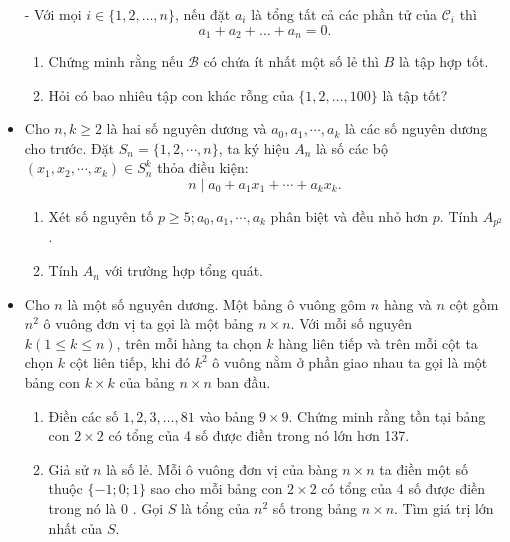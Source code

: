 \documentclass[11pt]{scrartcl}
\begin{document}
\begin{itemize}[label=, leftmargin=0em, itemsep=-0em]
\begin{btvn}
        - Với mọi $i \in\{1,2, \ldots, n\}$, nếu đặt $a_i$ là tổng tất cả các phần tử của $\mathcal{C}_i$ thì
        $$
        a_1+a_2+\ldots+a_n=0 .
        $$
        \begin{enumerate}[label=(\alph*)]
            \item Chứng minh rằng nếu $\mathcal{B}$ có chứa ít nhất một số lẻ thì $B$ là tập hợp tốt.
            \item Hỏi có bao nhiêu tập con khác rỗng của $\{1,2, \ldots, 100\}$ là tập tốt?
        \end{enumerate}
    \end{btvn}
    \item \begin{btvn}
        Cho $n, k \geq 2$ là hai số nguyên dương và $a_0, a_1, \cdots, a_k$ là các số nguyên dương cho trước. Đặt $S_n=\{1,2, \cdots, n\}$, ta ký hiệu $A_n$ là số các bộ $\left(x_1, x_2, \cdots, x_k\right) \in S_n^k$ thỏa điều kiện:
        $$
        n \mid a_0+a_1 x_1+\cdots+a_k x_k .
        $$
        \begin{enumerate}[label=(\alph*)]
            \item Xét số nguyên tố $p \geq 5 ; a_0, a_1, \cdots, a_k$ phân biệt và đều nhỏ hơn $p$. Tính $A_{p^2}$.
            \item Tính $A_n$ với trường hợp tổng quát.
        \end{enumerate}
    \end{btvn}
    \item \begin{btvn}
        Cho $n$ là một số nguyên dương. Một bảng ô vuông gôm $n$ hàng và $n$ cột gồm $n^2$ ô vuông đơn vị ta gọi là một bảng $n \times n$.
        Với mỗi số nguyên $k(1 \leq k \leq n)$, trên mỗi hàng ta chọn $k$ hàng liên tiếp và trên mỗi cột ta chọn $k$ cột liên tiếp, khi đó $k^2$ ô vuông nằm ở phần giao nhau ta gọi là một bảng con $k \times k$ của bảng $n \times n$ ban đầu.
        \begin{enumerate}[label=(\alph*)]
            \item Điền các số $1,2,3, \ldots, 81$ vào bảng $9 \times 9$. Chứng minh rằng tồn tại bảng con $2 \times 2$ có tổng của 4 số được điền trong nó lớn hơn 137.
            \item Giả sử $n$ là số lẻ. Mỗi ô vuông đơn vị của bàng $n \times n$ ta điền một số thuộc $\{-1 ; 0 ; 1\}$ sao cho mỗi bảng con $2 \times 2$ có tổng của 4 số được điền trong nó là 0 . Gọi $S$ là tổng của $n^2$ số trong bảng $n \times n$. Tìm giá trị lớn nhất của $S$.

\end{enumerate}
\end{btvn}
\end{itemize}
\end{document}
